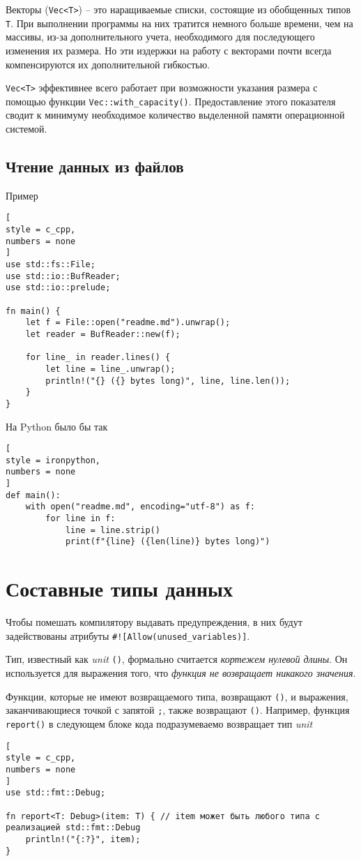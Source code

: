 \documentclass[%
	11pt,
	a4paper,
	utf8,
		]{article}
\begin{document}
Векторы (\verb|Vec<T>|) -- это наращиваемые списки, состоящие из обобщенных типов \texttt{T}. При выполнении программы на них тратится немного больше времени, чем на массивы, из-за дополнительного учета, необходимого для последующего изменения их размера. Но эти издержки на работу с векторами почти всегда компенсируются их дополнительной гибкостью. 

\verb|Vec<T>| эффективнее всего работает при возможности указания размера с помощью функции \verb|Vec::with_capacity()|. Предоставление этого показателя сводит к минимуму необходимое количество выделенной памяти операционной системой.

\subsection{Чтение данных из файлов}

Пример
\begin{lstlisting}[
style = c_cpp,
numbers = none
]
use std::fs::File;
use std::io::BufReader;
use std::io::prelude;

fn main() {
    let f = File::open("readme.md").unwrap();
    let reader = BufReader::new(f);
    
    for line_ in reader.lines() {
        let line = line_.unwrap();
        println!("{} ({} bytes long)", line, line.len());
    }
}
\end{lstlisting}

На Python было бы так
\begin{lstlisting}[
style = ironpython,
numbers = none
]
def main():
    with open("readme.md", encoding="utf-8") as f:
        for line in f:
            line = line.strip()
            print(f"{line} ({len(line)} bytes long)")
\end{lstlisting}

\section{Составные типы данных}

Чтобы помешать компилятору выдавать предупреждения, в них будут задействованы атрибуты \verb|#![Allow(unused_variables)]|.

Тип, известный как \emph{unit} \verb|()|, формально считается \emph{кортежем нулевой длины}. Он используется для выражения того, что \emph{функция не возвращает никакого значения}.

Функции, которые не имеют возвращаемого типа, возвращают \verb|()|, и выражения, заканчивающиеся точкой с запятой \verb|;|, также возвращают \verb|()|. Например, функция \texttt{report()} в следующем блоке кода подразумеваемо возвращает тип \emph{unit}
\begin{lstlisting}[
style = c_cpp,
numbers = none
]
use std::fmt::Debug;

fn report<T: Debug>(item: T) { // item может быть любого типа с реализацией std::fmt::Debug
    println!("{:?}", item);
}
\end{lstlisting}
\end{document}
